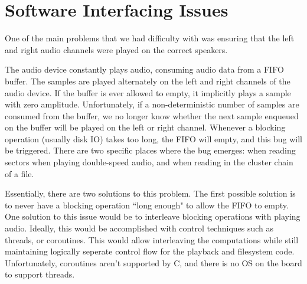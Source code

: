 \documentclass[12pt]{article}
\begin{document}

\section{Software Interfacing Issues}

One of the main problems that we had difficulty with was ensuring that the
left and right audio channels were played on the correct speakers.

The audio device constantly plays audio, consuming audio data from
a FIFO buffer.
The samples are played alternately on the left and right channels of
the audio device.
If the buffer is ever allowed to empty, it implicitly plays a sample with zero
amplitude.
Unfortunately, if a non-deterministic number of samples are consumed from the
buffer, we no longer know whether the next sample enqueued on the buffer will
be played on the left or right channel.
Whenever a blocking operation (usually disk IO) takes too long, the FIFO will
empty, and this bug will be triggered.
There are two specific places where the bug emerges: when reading sectors when
playing double-speed audio, and when reading in the cluster chain of a file.


Essentially, there are two solutions to this problem.
The first possible solution is to never have a blocking operation ``long enough"
to allow the FIFO to empty.
One solution to this issue would be to interleave blocking operations with playing
audio.
Ideally, this would be accomplished with control techniques such as threads, or
coroutines.
This would allow interleaving the computations while still maintaining logically
seperate control flow for the playback and filesystem code.
Unfortunately, coroutines aren't supported by C, and there is no OS on the board
to support threads.
\end{document}
